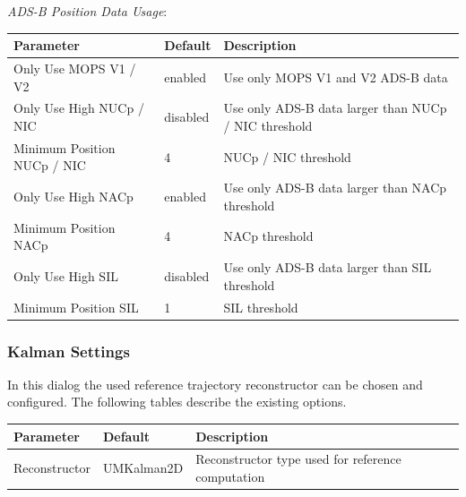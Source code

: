 \textit{ADS-B Position Data Usage}:
\begin{table}[H]
    \center
    \begin{tabularx}{\textwidth}{ | l | l | X |}
        \hline
        \textbf{Parameter} & \textbf{Default} & \textbf{Description} \\ \hline
        Only Use MOPS V1 / V2 & enabled & Use only MOPS V1 and V2 ADS-B data \\ \hline
        Only Use High NUCp / NIC & disabled & Use only ADS-B data larger than NUCp / NIC threshold \\ \hline
        Minimum Position NUCp / NIC & 4 &  NUCp / NIC threshold \\ \hline
        Only Use High NACp & enabled & Use only ADS-B data larger than NACp threshold \\ \hline
        Minimum Position NACp & 4 & NACp threshold \\ \hline
        Only Use High SIL & disabled & Use only ADS-B data larger than SIL threshold \\ \hline
        Minimum Position SIL & 1 & SIL threshold \\ \hline
    \end{tabularx}
\end{table}

\subsubsection*{Kalman Settings}


In this dialog the used reference trajectory reconstructor can be chosen and configured.
The following tables describe the existing options.

\begin{table}[H]
    \center
    \begin{tabularx}{\textwidth}{ | l | l | X |}
        \hline
        \textbf{Parameter} & \textbf{Default} & \textbf{Description} \\ \hline
        Reconstructor & UMKalman2D & Reconstructor type used for reference computation \\ \hline
    \end{tabularx}
\end{table}

